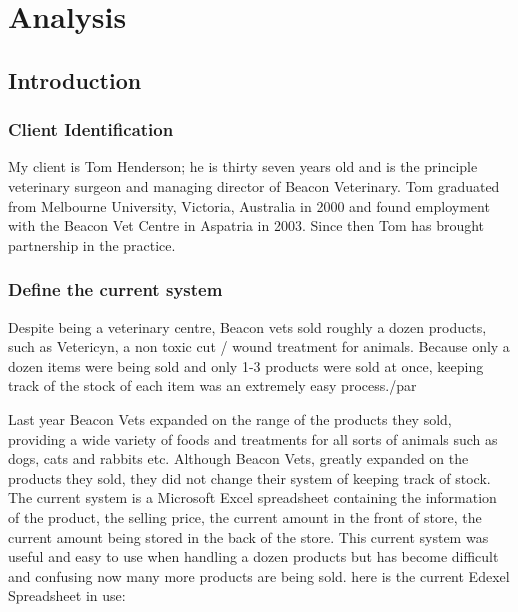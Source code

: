 \chapter{Analysis}

\section{Introduction}

\subsection{Client Identification}

	\begin{flushleft}

My client is Tom Henderson; he is thirty seven years old and is the principle veterinary surgeon and managing director of Beacon Veterinary. Tom graduated from Melbourne University, Victoria, Australia in 2000 and found employment with the Beacon Vet Centre in Aspatria in 2003. Since then Tom has brought partnership in the practice. \par


	\end{flushleft}

\subsection{Define the current system}


Despite being a veterinary centre, Beacon vets sold roughly a dozen products, such as Vetericyn, a non toxic cut / wound treatment for animals. Because only a dozen items were being sold and only 1-3 products were sold at once, keeping track of the stock of each item was an extremely easy process./par

Last year Beacon Vets expanded on the range of the products they sold, providing a wide variety of foods and treatments for all sorts of animals such as dogs, cats and rabbits etc. Although Beacon Vets, greatly expanded on the products they sold, they did not change their system of keeping track of stock. The current system is a Microsoft Excel spreadsheet containing the information of the product, the selling price, the current amount in the front of store, the current amount being stored in the back of the store. This current system was useful and easy to use when handling a dozen products but has become difficult and confusing now many more products are being sold. here is the current Edexel Spreadsheet in use:\par

